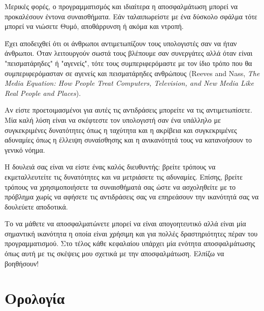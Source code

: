 \documentclass[10pt]{book}
\begin{document}
Μερικές φορές, ο προγραμματισμός και ιδιαίτερα η αποσφαλμάτωση  μπορεί να προκαλέσουν 
έντονα συναισθήματα. Εάν ταλαιπωρείστε με ένα δύσκολο σφάλμα τότε μπορεί να
νιώσετε Θυμό, αποθάρρυνση ή ακόμα και ντροπή.

Έχει αποδειχθεί ότι οι άνθρωποι αντιμετωπίζουν τους υπολογιστές
σαν να ήταν άνθρωποι.  Όταν λειτουργούν σωστά τους βλέπουμε σαν συνεργάτες αλλά 
όταν είναι "πεισματάρηδες" ή "αγενείς", τότε τους συμπεριφερόμαστε με τον
ίδιο τρόπο που θα συμπεριφερόμασταν σε αγενείς και πεισματάρηδες ανθρώπους
(Reeves and Nass, {\it The Media Equation: How People Treat Computers, Television, and New Media Like Real People and Places}).

Αν είστε προετοιμασμένοι για αυτές τις αντιδράσεις μπορείτε να
τις αντιμετωπίσετε.  Μία καλή λύση είναι να σκέφτεστε
τον υπολογιστή σαν ένα υπάλληλο με συγκεκριμένες δυνατότητες όπως
η ταχύτητα και η ακρίβεια και συγκεκριμένες αδυναμίες όπως η έλλειψη
συναίσθησης και η ανικανότητά τους να κατανοήσουν το γενικό νόημα.

Η δουλειά σας είναι να είστε ένας καλός διευθυντής: βρείτε τρόπους
να εκμεταλλευτείτε τις δυνατότητες και να μετριάσετε τις αδυναμίες.  
Επίσης, βρείτε τρόπους να χρησιμοποιήσετε τα συναισθήματά σας ώστε
να ασχοληθείτε με το πρόβλημα χωρίς να αφήσετε τις αντιδράσεις σας
να επηρεάσουν την ικανότητά σας να δουλεύετε αποδοτικά.

Το να μάθετε να αποσφαλματώνετε μπορεί να είναι απογοητευτικό
αλλά είναι μία σημαντική ικανότητα η οποία είναι χρήσιμη και για
πολλές δραστηριότητες πέραν του προγραμματισμού.  Στο τέλος κάθε
κεφαλαίου υπάρχει μία ενότητα αποσφαλμάτωσης όπως αυτή με τις
σκέψεις μου σχετικά με την αποσφαλμάτωση. Ελπίζω να βοηθήσουν!


\section{Ορολογία}
\end{document}
